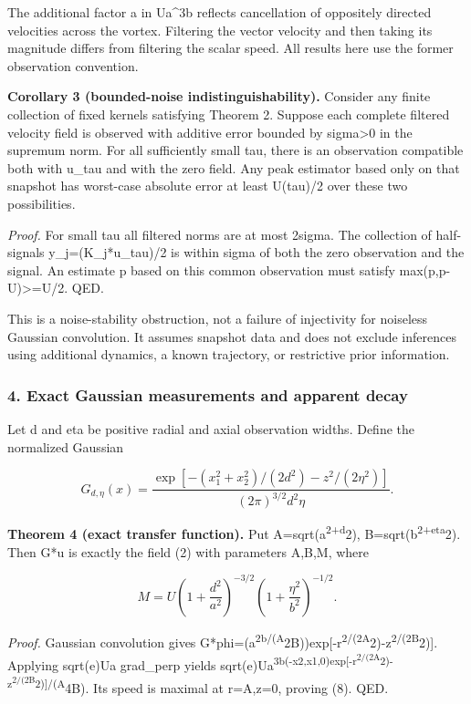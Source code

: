 \documentclass[
]{article}
\begin{document}
The additional factor a in Ua\^{}3b reflects cancellation of oppositely
directed velocities across the vortex. Filtering the vector velocity and
then taking its magnitude differs from filtering the scalar speed. All
results here use the former observation convention.

\textbf{Corollary 3 (bounded-noise indistinguishability).} Consider any
finite collection of fixed kernels satisfying Theorem 2. Suppose each
complete filtered velocity field is observed with additive error bounded
by sigma\textgreater0 in the supremum norm. For all sufficiently small
tau, there is an observation compatible both with u\_tau and with the
zero field. Any peak estimator based only on that snapshot has
worst-case absolute error at least U(tau)/2 over these two
possibilities.

\emph{Proof.} For small tau all filtered norms are at most 2sigma. The
collection of half-signals y\_j=(K\_j*u\_tau)/2 is within sigma of both
the zero observation and the signal. An estimate p based on this common
observation must satisfy
max(\textbar p\textbar,\textbar p-U\textbar)\textgreater=U/2. QED.

This is a noise-stability obstruction, not a failure of injectivity for
noiseless Gaussian convolution. It assumes snapshot data and does not
exclude inferences using additional dynamics, a known trajectory, or
restrictive prior information.

\hypertarget{exact-gaussian-measurements-and-apparent-decay}{%
\subsubsection{4. Exact Gaussian measurements and apparent
decay}\label{exact-gaussian-measurements-and-apparent-decay}}

Let d and eta be positive radial and axial observation widths. Define
the normalized Gaussian

\[
G_{d,\eta}(x)=\frac{\exp[-(x_1^2+x_2^2)/(2d^2)-z^2/(2\eta^2)]}
{(2\pi)^{3/2}d^2\eta}. \tag{7}
\]

\textbf{Theorem 4 (exact transfer function).} Put
A=sqrt(a\textsuperscript{2+d}2), B=sqrt(b\textsuperscript{2+eta}2). Then
G*u is exactly the field (2) with parameters A,B,M, where

\[
M=U\left(1+\frac{d^2}{a^2}\right)^{-3/2}
\left(1+\frac{\eta^2}{b^2}\right)^{-1/2}. \tag{8}
\]

\emph{Proof.} Gaussian convolution gives
G*phi=(a\textsuperscript{2b/(A}2B))exp{[}-r\textsuperscript{2/(2A}2)-z\textsuperscript{2/(2B}2){]}.
Applying sqrt(e)Ua grad\_perp yields
sqrt(e)Ua\textsuperscript{3b(-x2,x1,0)exp{[}-r\textsuperscript{2/(2A}2)-z\textsuperscript{2/(2B}2){]}/(A}4B).
Its speed is maximal at r=A,z=0, proving (8). QED.
\end{document}
